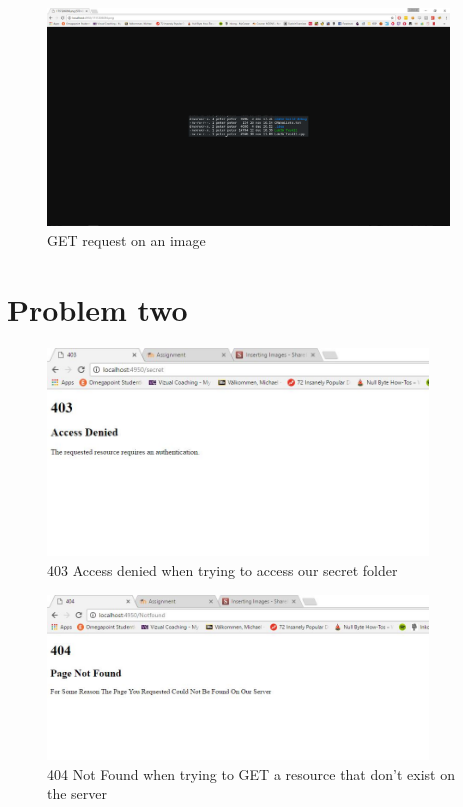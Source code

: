 \documentclass[a4paper,12pt]{article}
\numberwithin{figure}{section}
\begin{document}
\begin{figure}[hp!]
	\centering
	\label{PNG}
	\includegraphics[width=0.95\textwidth,keepaspectratio]{img/PNGFile.jpg} 
	\caption{GET request on an image}
\end{figure}

\newpage
\section{Problem two}

\begin{figure}[h!]
	\centering
	\label{Access denied}
	\includegraphics[width=0.90\textwidth,keepaspectratio]{img/403.jpg} 
	\caption{403 Access denied when trying to access our secret folder}
\end{figure}

\begin{figure}[h!]
	\centering
	\label{not found}
	\includegraphics[width=0.90\textwidth,keepaspectratio]{img/404.jpg} 
	\caption{404 Not Found when trying to GET a resource that don't exist on the server}
\end{figure}
\end{document}
